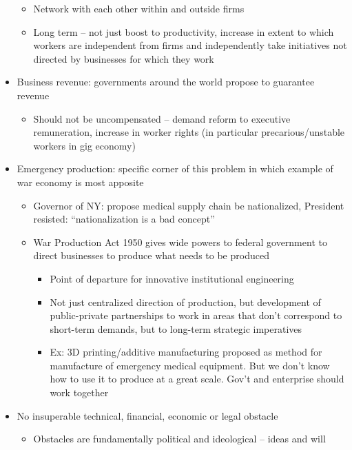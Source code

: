 \begin{itemize}
  \begin{itemize}
  \tightlist
  \item
    Network with each other within and outside firms
  \item
    Long term -- not just boost to productivity, increase in extent to
    which workers are independent from firms and independently take
    initiatives not directed by businesses for which they work
  \end{itemize}
\item
  Business revenue: governments around the world propose to guarantee
  revenue

  \begin{itemize}
  \tightlist
  \item
    Should not be uncompensated -- demand reform to executive
    remuneration, increase in worker rights (in particular
    precarious/unstable workers in gig economy)
  \end{itemize}
\item
  Emergency production: specific corner of this problem in which example
  of war economy is most apposite

  \begin{itemize}
  \tightlist
  \item
    Governor of NY: propose medical supply chain be nationalized,
    President resisted: ``nationalization is a bad concept''
  \item
    War Production Act 1950 gives wide powers to federal government to
    direct businesses to produce what needs to be produced

    \begin{itemize}
    \tightlist
    \item
      Point of departure for innovative institutional engineering
    \item
      Not just centralized direction of production, but development of
      public-private partnerships to work in areas that don't correspond
      to short-term demands, but to long-term strategic imperatives
    \item
      Ex: 3D printing/additive manufacturing proposed as method for
      manufacture of emergency medical equipment. But we don't know how
      to use it to produce at a great scale. Gov't and enterprise should
      work together
    \end{itemize}
  \end{itemize}
\item
  No insuperable technical, financial, economic or legal obstacle

  \begin{itemize}
  \tightlist
  \item
    Obstacles are fundamentally political and ideological -- ideas and
    will
  \end{itemize}
\end{itemize}


